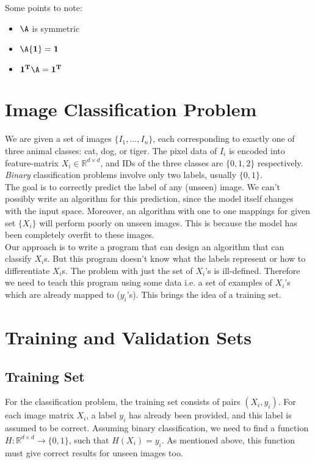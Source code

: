 \documentclass[12pt]{article}
\begin{document}
\noindent Some points to note:
\begin{itemize}
	\itemsep0em
	\item $\A$ is symmetric
	\item $\A{\bf 1} = {\bf 1}$
	\item ${\bf 1^T}\A = {\bf 1^T}$
\end{itemize}


\section{Image Classification Problem}

We are given a set of images $\{I_1, \dots, I_n\}$, each corresponding to exactly one of three animal classes: cat, dog, or tiger. The pixel data of $I_i$ is encoded into feature-matrix $X_i \in \mathbb{R}^{d\times d}$, and IDs of the three classes are $\{0,1,2\}$ respectively. \textit{Binary} classification problems involve only two labels, usually $\{0,1\}$.
\\

\noindent The goal is to correctly predict the label of any (unseen) image. We can't possibly write an algorithm for this prediction, since the model itself changes with the input space. Moreover, an algorithm with one to one mappings for given set $\{X_i\}$ will perform poorly on unseen images. This is because the model has been completely overfit to these images.
\\

\noindent Our approach is to write a program that can design an algorithm that can classify $X_i$s. But this program doesn't know what the labels represent or how to differentiate $X_i$s. The problem with just the set of $X_i$'s is ill-defined. Therefore we need to teach this program using some data i.e. a set of examples of $X_i$'s which are already mapped to ($y_i$'s). This brings the idea of a training set.

\section{Training and Validation Sets}


\subsection{Training Set}
For the classification problem, the training set consists of pairs $(X_i,y_i)$. For each image matrix $X_i$, a label $y_i$ has already been provided, and this label is assumed to be correct. Assuming binary classification, we need to find a function $H : \mathbb{R}^{d\times d} \to \{0,1\}$, such that $H(X_i)=y_i$. As mentioned above, this function must give correct results for unseen images too.
\end{document}
